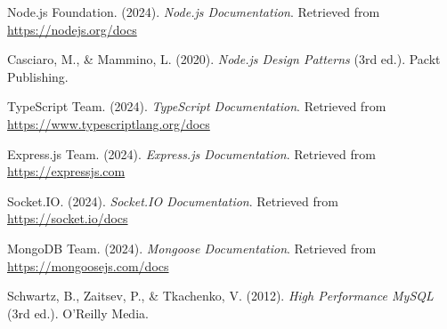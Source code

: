 \begin{thebibliography}{9}
    
    Node.js Foundation. (2024). \textit{Node.js Documentation}. Retrieved from \url{https://nodejs.org/docs}
    
    Casciaro, M., \& Mammino, L. (2020). \textit{Node.js Design Patterns} (3rd ed.). Packt Publishing.
    
    TypeScript Team. (2024). \textit{TypeScript Documentation}. Retrieved from \url{https://www.typescriptlang.org/docs}
    
    Express.js Team. (2024). \textit{Express.js Documentation}. Retrieved from \url{https://expressjs.com}
    
    Socket.IO. (2024). \textit{Socket.IO Documentation}. Retrieved from \url{https://socket.io/docs}
    
    MongoDB Team. (2024). \textit{Mongoose Documentation}. Retrieved from \url{https://mongoosejs.com/docs}
    
    Schwartz, B., Zaitsev, P., \& Tkachenko, V. (2012). \textit{High Performance MySQL} (3rd ed.). O'Reilly Media.
    
\end{thebibliography}
